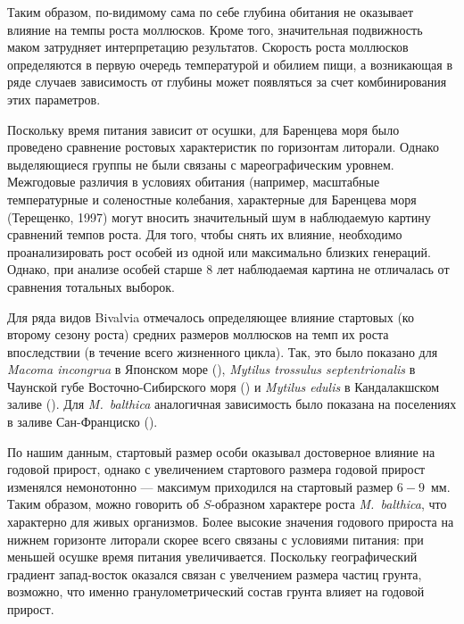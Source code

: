Таким образом, по-видимому сама по себе глубина обитания не оказывает влияние на темпы роста моллюсков. 
Кроме того, значительная подвижность маком затрудняет интерпретацию результатов. 
Скорость роста моллюсков определяются в первую очередь температурой и обилием пищи, а возникающая в ряде случаев зависимость от глубины может появляться за счет комбинирования этих параметров.

Поскольку время питания зависит от осушки, для Баренцева моря было проведено сравнение ростовых характеристик по горизонтам литорали. Однако выделяющиеся группы не были связаны с мареографическим уровнем.
Межгодовые различия в условиях обитания (например, масштабные температурные и соленостные колебания, характерные для Баренцева моря (Терещенко, 1997) могут вносить значительный шум в наблюдаемую картину сравнений темпов роста. 
Для того, чтобы снять их влияние, необходимо проанализировать рост особей из одной или максимально близких генераций. 
Однако, при анализе особей старше 8 лет наблюдаемая картина не отличалась от сравнения тотальных выборок.

Для ряда видов Bivalvia отмечалось определяющее влияние стартовых (ко второму сезону роста) средних размеров моллюсков на темп их роста впоследствии (в течение всего жизненного цикла). 
Так, это было показано для {\it Macoma incongrua}  в Японском море (\cite{Maximovich_Lysenko_1986}), {\it Mytilus trossulus septentrionalis} в Чаунской губе Восточно-Сибирского моря (\cite{Gagaev_et_al_1994}) и {\it Mytilus edulis} в Кандалакшском заливе (\cite{Maximovich_et_al_1993}). 
Для {\it M.~balthica} аналогичная зависимость было показана на поселениях в заливе Сан-Франциско (\cite{Cloern_Nichols_1978}). 

По нашим данным, стартовый размер особи оказывал достоверное влияние на годовой прирост, однако с увеличением стартового размера годовой прирост изменялся немонотонно — максимум приходился на стартовый размер $6-9$~мм. 
Таким образом, можно говорить об $S$-образном характере роста  {\it M.~balthica}, что характерно для живых организмов.
Более высокие значения годового прироста на нижнем горизонте литорали скорее всего связаны с условиями питания: при меньшей осушке время питания увеличивается.
Поскольку географический градиент запад-восток оказался связан с увелчением размера частиц грунта, возможно, что именно гранулометрический состав грунта влияет на годовой прирост. 



